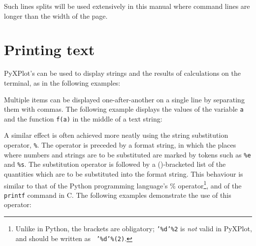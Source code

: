 \vspace{3mm}
\newline
{}\newline
{}
\vspace{3mm}

\noindent Such lines splits will be used extensively in this manual where
command lines are longer than the width of the page.

\section{Printing text}

PyXPlot's  can be used to display strings and the results of
calculations on the terminal, as in the following examples:

\vspace{3mm}
\newline
{}\newline
{}\newline
{}\newline
{}
\vspace{3mm}

Multiple items can be displayed one-after-another on a single line by
separating them with commas. The following example displays the values of the
variable {\tt a} and the function {\tt f(a)} in the middle of a text string:

\vspace{3mm}
\newline
{}\newline
{}\newline
{}
\vspace{3mm}

A similar effect is often achieved more neatly using the string substitution
operator, {\tt \%}.  The operator is preceded by a format string, in
which the places where numbers and strings are to be substituted are marked by
tokens such as {\tt \%e} and {\tt \%s}. The substitution operator is followed
by a ()-bracketed list of the quantities which are to be substituted into the
format string. This behaviour is similar to that of the Python programming
language's \% operator\footnote{Unlike in Python, the brackets are obligatory;
{\tt '\%d'\%2} is {\it not} valid in PyXPlot, and should be written as {\tt
'\%d'\%(2)}.}, and of the {\tt printf} command in C.  The following examples
demonstrate the use of this operator:

